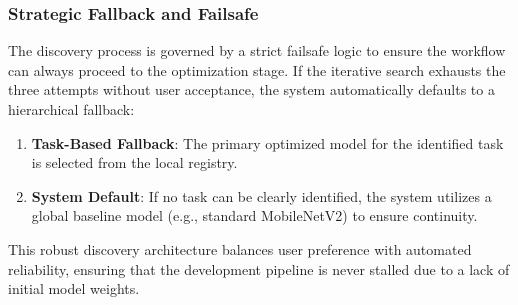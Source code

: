 \subsubsection{Strategic Fallback and Failsafe}

The discovery process is governed by a strict failsafe logic to ensure the workflow can always proceed to the optimization stage. If the iterative search exhausts the three attempts without user acceptance, the system automatically defaults to a hierarchical fallback:
\begin{enumerate}
    \item \textbf{Task-Based Fallback}: The primary optimized model for the identified task is selected from the local registry.
    \item \textbf{System Default}: If no task can be clearly identified, the system utilizes a global baseline model (e.g., standard MobileNetV2) to ensure continuity.
\end{enumerate}

This robust discovery architecture balances user preference with automated reliability, ensuring that the development pipeline is never stalled due to a lack of initial model weights.

